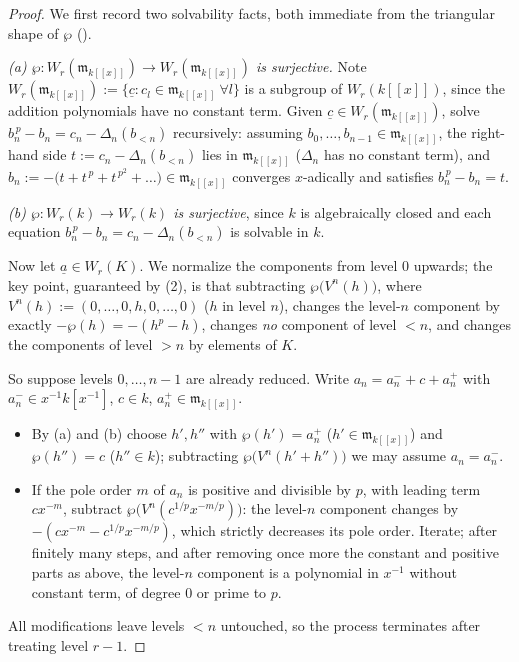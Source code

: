 \documentclass[11pt]{article}
\newcommand{\wv}[1]{\underline{#1}}                 %
\newcommand{\mm}{\mathfrak{m}_{k[[x]]}}             %
\begin{document}
\begin{proof}
We first record two solvability facts, both immediate from the triangular
shape of $\wp$ ().

\emph{(a) $\wp\colon W_r(\mm)\to W_r(\mm)$ is surjective.}
Note $W_r(\mm):=\{\wv c: c_l\in\mm\ \forall l\}$ is a subgroup of
$W_r(k[[x]])$, since the addition polynomials have no constant term.
Given $\wv c\in W_r(\mm)$, solve $b_n^{\,p}-b_n=c_n-\Delta_n(b_{<n})$
recursively: assuming $b_0,\dots,b_{n-1}\in\mm$, the right-hand side
$t:=c_n-\Delta_n(b_{<n})$ lies in $\mm$ ($\Delta_n$ has no constant term),
and $b_n:=-\big(t+t^{\,p}+t^{\,p^2}+\dots\big)\in\mm$ converges $x$-adically
and satisfies $b_n^{\,p}-b_n=t$.

\emph{(b) $\wp\colon W_r(k)\to W_r(k)$ is surjective}, since $k$ is
algebraically closed and each equation
$b_n^{\,p}-b_n=c_n-\Delta_n(b_{<n})$ is solvable in $k$.

Now let $\wv a\in W_r(K)$.  We normalize the components from level $0$
upwards; the key point, guaranteed by (2), is that
subtracting $\wp\big(V^n(h)\big)$, where
$V^n(h):=(0,\dots,0,h,0,\dots,0)$ ($h$ in level $n$), changes the level-$n$
component by exactly $-\wp(h)=-(h^p-h)$, changes \emph{no} component of
level $<n$, and changes the components of level $>n$ by elements of $K$.

So suppose levels $0,\dots,n-1$ are already reduced.  Write
$a_n=a_n^-+c+a_n^+$ with $a_n^-\in x^{-1}k[x^{-1}]$, $c\in k$,
$a_n^+\in\mm$.
\begin{itemize}
  \item By (a) and (b) choose $h',h''$ with $\wp(h')=a_n^+$
        ($h'\in\mm$) and $\wp(h'')=c$ ($h''\in k$); subtracting
        $\wp\big(V^n(h'+h'')\big)$ we may assume $a_n=a_n^-$.
  \item If the pole order $m$ of $a_n$ is positive and divisible by $p$,
        with leading term $cx^{-m}$, subtract
        $\wp\big(V^n(c^{1/p}x^{-m/p})\big)$: the level-$n$ component
        changes by $-(cx^{-m}-c^{1/p}x^{-m/p})$, which strictly decreases
        its pole order.  Iterate; after finitely many steps, and after
        removing once more the constant and positive parts as above, the
        level-$n$ component is a polynomial in $x^{-1}$ without constant
        term, of degree $0$ or prime to $p$.
\end{itemize}
All modifications leave levels $<n$ untouched, so the process terminates
after treating level $r-1$.
\end{proof}
\end{document}
